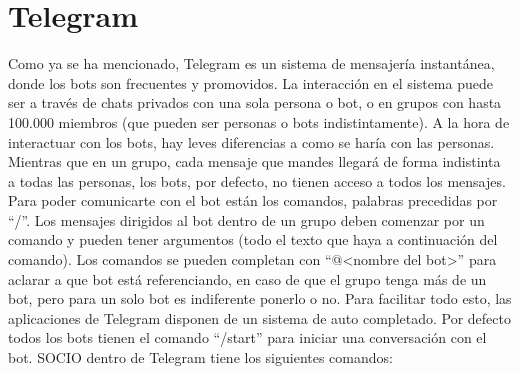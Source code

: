 \section{Telegram}
Como ya se ha mencionado, Telegram es un sistema de mensajería instantánea, donde los bots son frecuentes y promovidos. La interacción en el sistema puede ser a través de chats privados con una sola persona o bot, o en grupos con hasta 100.000 miembros (que pueden ser personas o bots indistintamente). A la hora de interactuar con los bots, hay leves diferencias a como se haría con las personas. Mientras que en un grupo, cada mensaje que mandes llegará de forma indistinta a todas las personas, los bots, por defecto, no tienen acceso a todos los mensajes. Para poder comunicarte con el bot están los comandos, palabras precedidas por ``/''. Los mensajes dirigidos al bot dentro de un grupo deben comenzar por un comando y pueden tener argumentos (todo el texto que haya a continuación del comando). Los comandos se pueden completan con ``@<nombre del bot>'' para aclarar a que bot está referenciando, en caso de que el grupo tenga más de un bot, pero para un solo bot es indiferente ponerlo o no. Para facilitar todo esto, las aplicaciones de Telegram disponen de un sistema de auto completado. Por defecto todos los bots tienen el comando ``/start'' para iniciar una conversación con el bot. SOCIO dentro de Telegram tiene los siguientes comandos:

